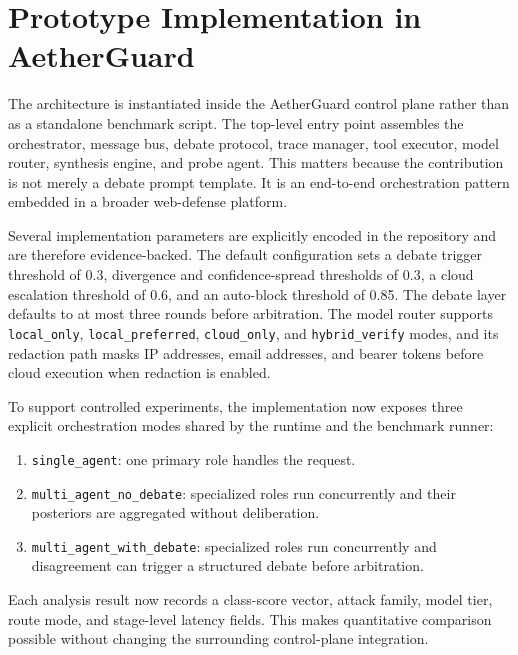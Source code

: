 \documentclass{ieeeaccess}
\newcommand{\sys}{AetherGuard}
\newcommand{\repo}[1]{\texttt{\detokenize{#1}}}
\begin{document}
\section{Prototype Implementation in \sys{}}
\label{sec:implementation}

The architecture is instantiated inside the \sys{} control plane rather than as a standalone benchmark script. The top-level entry point \repo{ai-agents/index.ts} assembles the orchestrator, message bus, debate protocol, trace manager, tool executor, model router, synthesis engine, and probe agent. This matters because the contribution is not merely a debate prompt template. It is an end-to-end orchestration pattern embedded in a broader web-defense platform.

Several implementation parameters are explicitly encoded in the repository and are therefore evidence-backed. The default configuration sets a debate trigger threshold of 0.3, divergence and confidence-spread thresholds of 0.3, a cloud escalation threshold of 0.6, and an auto-block threshold of 0.85. The debate layer defaults to at most three rounds before arbitration. The model router supports \texttt{local\_only}, \texttt{local\_preferred}, \texttt{cloud\_only}, and \texttt{hybrid\_verify} modes, and its redaction path masks IP addresses, email addresses, and bearer tokens before cloud execution when redaction is enabled.

To support controlled experiments, the implementation now exposes three explicit orchestration modes shared by the runtime and the benchmark runner:
\begin{enumerate}
\item \texttt{single\_agent}: one primary role handles the request.
\item \texttt{multi\_agent\_no\_debate}: specialized roles run concurrently and their posteriors are aggregated without deliberation.
\item \texttt{multi\_agent\_with\_debate}: specialized roles run concurrently and disagreement can trigger a structured debate before arbitration.
\end{enumerate}
Each analysis result now records a class-score vector, attack family, model tier, route mode, and stage-level latency fields. This makes quantitative comparison possible without changing the surrounding control-plane integration.
\end{document}
